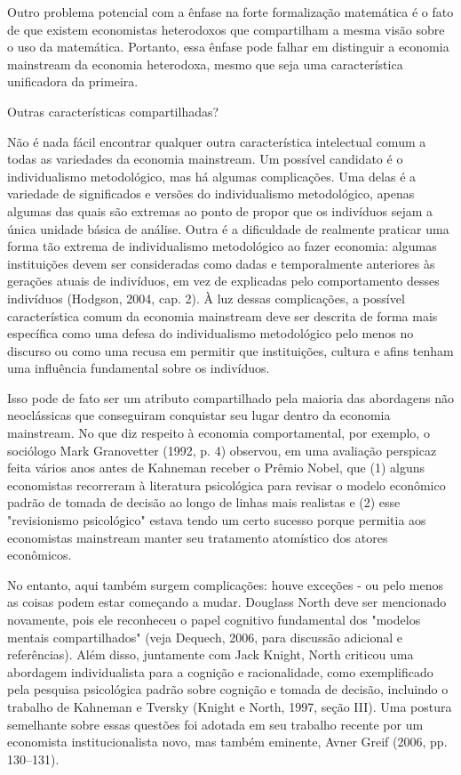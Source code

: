 \documentclass[12pt]{article}
\begin{document}
Outro problema potencial com a ênfase na forte formalização matemática é o fato de que existem economistas heterodoxos que compartilham a mesma visão sobre o uso da matemática. Portanto, essa ênfase pode falhar em distinguir a economia mainstream da economia heterodoxa, mesmo que seja uma característica unificadora da primeira.

Outras características compartilhadas?

Não é nada fácil encontrar qualquer outra característica intelectual comum a todas as variedades da economia mainstream. Um possível candidato é o individualismo metodológico, mas há algumas complicações. Uma delas é a variedade de significados e versões do individualismo metodológico, apenas algumas das quais são extremas ao ponto de propor que os indivíduos sejam a única unidade básica de análise. Outra é a dificuldade de realmente praticar uma forma tão extrema de individualismo metodológico ao fazer economia: algumas instituições devem ser consideradas como dadas e temporalmente anteriores às gerações atuais de indivíduos, em vez de explicadas pelo comportamento desses indivíduos (Hodgson, 2004, cap. 2). À luz dessas complicações, a possível característica comum da economia mainstream deve ser descrita de forma mais específica como uma defesa do individualismo metodológico pelo menos no discurso ou como uma recusa em permitir que instituições, cultura e afins tenham uma influência fundamental sobre os indivíduos.

Isso pode de fato ser um atributo compartilhado pela maioria das abordagens não neoclássicas que conseguiram conquistar seu lugar dentro da economia mainstream. No que diz respeito à economia comportamental, por exemplo, o sociólogo Mark Granovetter (1992, p. 4) observou, em uma avaliação perspicaz feita vários anos antes de Kahneman receber o Prêmio Nobel, que (1) alguns economistas recorreram à literatura psicológica para revisar o modelo econômico padrão de tomada de decisão ao longo de linhas mais realistas e (2) esse "revisionismo psicológico" estava tendo um certo sucesso porque permitia aos economistas mainstream manter seu tratamento atomístico dos atores econômicos.

No entanto, aqui também surgem complicações: houve exceções - ou pelo menos as coisas podem estar começando a mudar. Douglass North deve ser mencionado novamente, pois ele reconheceu o papel cognitivo fundamental dos "modelos mentais compartilhados" (veja Dequech, 2006, para discussão adicional e referências). Além disso, juntamente com Jack Knight, North criticou uma abordagem individualista para a cognição e racionalidade, como exemplificado pela pesquisa psicológica padrão sobre cognição e tomada de decisão, incluindo o trabalho de Kahneman e Tversky (Knight e North, 1997, seção III). Uma postura semelhante sobre essas questões foi adotada em seu trabalho recente por um economista institucionalista novo, mas também eminente, Avner Greif (2006, pp. 130–131).
\end{document}
